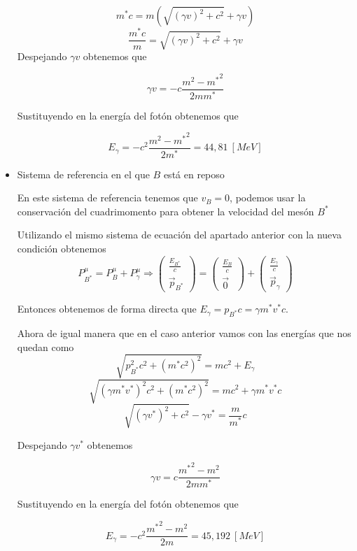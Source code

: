 \documentclass{article}
\begin{document}
\begin{itemize}
\[m^{*}c=m(\sqrt{(\gamma v)^{2}+c^{2}}+\gamma v )\]
\[\frac{m^{*}c}{m}=\sqrt{(\gamma v)^{2}+c^{2}}+\gamma v \]
Despejando $\gamma v$ obtenemos que  

\[\gamma v= -c\frac{m^{2}-{m^{*}}^{2}}{2mm^{*}}\]

Sustituyendo en la energía del fotón obtenemos que 

\[E_{\gamma}= -c^{2}\frac{m^{2}-{m^{*}}^{2}}{2m^{*}}=44,81~\left[ MeV\right]\]


  \item Sistema de referencia en el que $B$ está en reposo
  
  En este sistema de referencia tenemos que $v_{B}=0$, podemos usar la conservación del cuadrimomento para obtener la velocidad del mesón $B^{*}$
  
  Utilizando el mismo sistema de ecuación del apartado anterior con la nueva condición obtenemos 
  \[P^{\mu}_{B^{*}}=P^{\mu}_{B}+P^{\mu}_{\gamma}\Rightarrow \begin{pmatrix}
      \frac{E_{B^{*}}}{c} \\
      \vec{p}_{B^{*}}
  \end{pmatrix}=\begin{pmatrix}
      \frac{E_{B}}{c} \\
      \vec{0}
  \end{pmatrix}+\begin{pmatrix}
    \frac{E_{\gamma}}{c}\\
      \vec{p}_{\gamma}
\end{pmatrix}\]

Entonces obtenemos de forma directa que $E_{\gamma}=p_{B^{*}}c=\gamma m^{*}v^{*}c$. 

Ahora de igual manera que en el caso anterior vamos con las energías que nos quedan como 
\[\sqrt{p_{B^{*}}^{2}c^{2}+(m^{*}c^{2})^{2}}=mc^{2}+ E_{\gamma}\]
\[\sqrt{(\gamma m^{*}v^{*})^{2}c^{2}+(m^{*}c^{2})^{2}}=mc^{2}+ \gamma m^{*}v^{*}c\]
\[\sqrt{(\gamma v^{*})^{2}+c^{2}}-\gamma v^{*}=\frac{m}{m^{*}}c\]

Despejando $\gamma v^{*}$ obtenemos 

\[\gamma v= c\frac{{m^{*}}^{2}-m^{2}}{2mm^{*}}\]

Sustituyendo en la energía del fotón obtenemos que 

\[E_{\gamma}= -c^{2}\frac{{m^{*}}^{2}-m^{2}}{2m}=45,192~\left[ MeV\right]\]

\end{itemize}

\newpage
\end{document}
